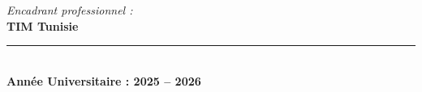 \begin{titlepage}
\begin{center}
\begin{minipage}[t]{0.45\textwidth}
\begin{flushright}
\textit{Encadrant professionnel :}\\[0.3cm]
\textbf{TIM Tunisie}\\
\end{flushright}
\end{minipage}

\vfill


\rule{\textwidth}{0.5pt}\\[0.3cm]
{\Large \textbf{Année Universitaire : 2025 -- 2026}}

\end{center}
\end{titlepage}

\newpage\thispagestyle{empty}\mbox{}\newpage
